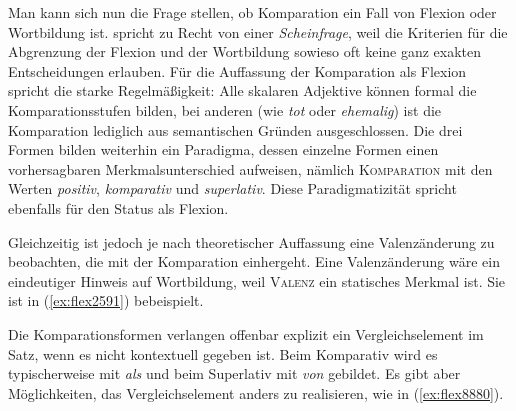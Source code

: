 \begin{exe}
  \ex \label{ex:flex2560}
  \begin{xlist}
  \end{xlist}
\end{exe}


Man kann sich nun die Frage stellen, ob Komparation ein Fall von Flexion oder Wortbildung ist.
\citet[177]{Eisenberg2013a} spricht zu Recht von einer \textit{Scheinfrage}, weil die Kriterien für die Abgrenzung der Flexion und der Wortbildung sowieso oft keine ganz exakten Entscheidungen erlauben.
Für die Auffassung der Komparation als Flexion spricht die starke Regelmäßigkeit:
Alle skalaren Adjektive können formal die Komparationsstufen bilden, bei anderen (wie \textit{tot} oder \textit{ehemalig}) ist die Komparation lediglich aus semantischen Gründen ausgeschlossen.
Die drei Formen bilden weiterhin ein Paradigma, dessen einzelne Formen einen vorhersagbaren Merkmalsunterschied aufweisen, nämlich \textsc{Komparation} mit den Werten \textit{positiv}, \textit{komparativ} und \textit{superlativ}.
Diese Paradigmatizität spricht ebenfalls für den Status als Flexion.

Gleichzeitig ist jedoch je nach theoretischer Auffassung eine Valenzänderung zu beobachten, die mit der Komparation einhergeht.
Eine Valenzänderung wäre ein eindeutiger Hinweis auf Wortbildung, weil \textsc{Valenz} ein statisches Merkmal ist.
Sie ist in (\ref{ex:flex2591}) bebeispielt.

\begin{exe}
  \ex \label{ex:flex2591}
  \begin{xlist}
  \end{xlist}
\end{exe}


Die Komparationsformen verlangen offenbar explizit ein Vergleichselement im Satz, wenn es nicht kontextuell gegeben ist.
Beim Komparativ wird es typischerweise mit \textit{als} und beim Superlativ mit \textit{von} gebildet.
Es gibt aber Möglichkeiten, das Vergleichselement anders zu realisieren, wie \zB in (\ref{ex:flex8880}).

